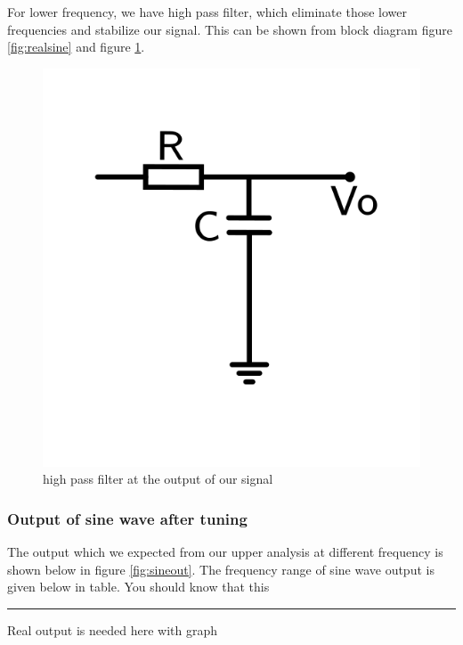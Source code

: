 \documentclass[14pt,a4paper]{extarticle}
\begin{document}
For lower frequency, we have high pass filter, which eliminate those lower frequencies and stabilize our signal. This can be shown from block diagram figure \ref{fig:realsine} and figure \ref{fig:highpass}.


\begin{figure}[h]
\centering
\includegraphics[width=0.3\linewidth]{imgs/highpassfilter2.png}
\caption{high pass filter at the output of our signal}
\label{fig:highpass}
\end{figure}


\subsubsection{Output of sine wave after tuning}
\label{sec:orgaa1796e}
The output which we expected from our upper analysis at different frequency is shown below in figure \ref{fig:sineout}. The frequency range of sine wave output is given below in table. You should know that this

\noindent\rule{\textwidth}{0.5pt}
Real output is needed here with graph
\end{document}
